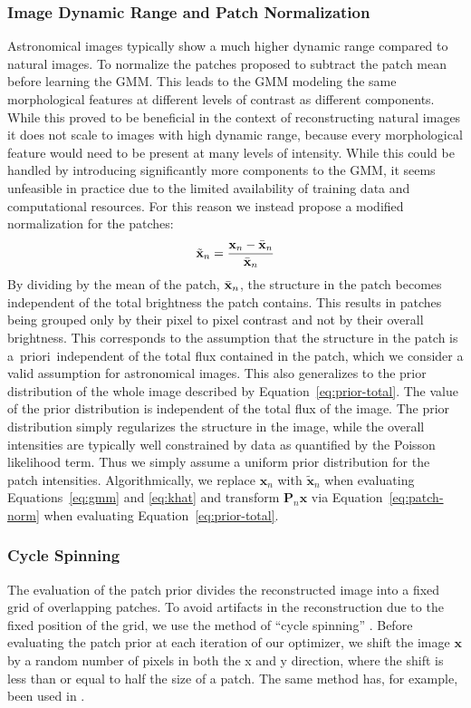 \documentclass[twocolumn, linenumbers]{aastex631}
\newcommand{\aprioir}{a~priori~}
\begin{document}
    \subsubsection{Image Dynamic Range and Patch Normalization}
    \label{ssec:patch-norm}
    Astronomical images typically show a much higher dynamic range compared to natural images. To normalize the patches \cite{Zoran2011} proposed to subtract the patch mean before learning the GMM. This leads to the GMM modeling the same morphological features at different levels of contrast as different components. While this proved to be beneficial in the context of reconstructing natural images it does not scale to images with high dynamic range, because every morphological feature would need to be present at many levels of intensity. While this could be handled by introducing significantly more components to the GMM, it seems unfeasible in practice due to the limited availability of training data and computational resources. For this reason we instead propose a modified normalization for the patches:
    \begin{equation}
        \label{eq:patch-norm}
        \tilde{\mathbf{x}}_n = \frac{\mathbf{x}_n - \Bar{\mathbf{x}}_n}{\Bar{\mathbf{x}}_n}
    \end{equation}
    By dividing by the mean of the patch, $\Bar{\mathbf{x}}_n$, the structure in the patch becomes independent of the total brightness the patch contains. This results in patches being grouped only by their pixel to pixel contrast and not by their overall brightness. This corresponds to the assumption that the structure in the patch is \aprioir independent of the total flux contained in the patch, which we consider a valid assumption for astronomical images. This also generalizes to the prior distribution of the whole image described by Equation~\ref{eq:prior-total}. The value of the prior distribution is independent of the total flux of the image. The prior distribution simply regularizes the structure in the image, while the overall intensities are typically well constrained by data as quantified by the Poisson likelihood term. Thus we simply assume a uniform prior distribution for the patch intensities. Algorithmically, we replace $\mathbf{x}_n$ with $\tilde{\mathbf{x}}_n$ when evaluating Equations~\ref{eq:gmm} and \ref{eq:khat} and transform $\mathbf{P}_n\mathbf{x}$ via Equation~\ref{eq:patch-norm} when evaluating Equation~\ref{eq:prior-total}.

    \subsubsection{Cycle Spinning}
    The evaluation of the patch prior divides the reconstructed image into a fixed grid of overlapping patches. To avoid artifacts in the reconstruction due to the fixed position of the grid, we use the method of \enquote{cycle spinning} \citep{Coifman1995}. Before evaluating the patch prior at each iteration of our optimizer, we shift the image $\mathbf{x}$ by a random number of pixels in both the x and y direction, where the shift is less than or equal to half the size of a patch. The same method has, for example, been used in \cite{Esch2004}.
    
\end{document}
